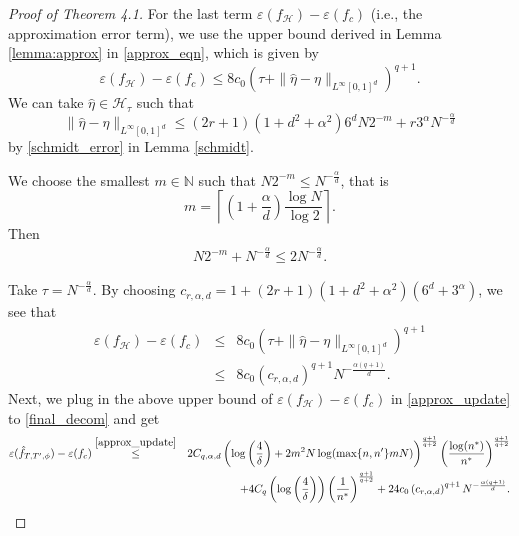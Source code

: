 \documentclass{article}
\def\NN{\mathbb N}
\begin{document}
\begin{proof}[Proof of Theorem 4.1]
  For the last term $\varepsilon(f_\mathcal{H}) - \varepsilon(f_c)$ (i.e., the approximation error term), we use the upper bound derived in Lemma \ref{lemma:approx} in \eqref{approx_eqn}, which is given by 
  \begin{equation*}
  \varepsilon(f_\mathcal{H}) - \varepsilon(f_c) \leq 8c_0\left(\tau +\|\widehat{\eta}-\eta\|_{L^\infty[0,1]^d}\right)^{q+1}.
  \end{equation*}
  We can take $\widehat{\eta} \in \mathcal{H}_\tau$ such that
  $$\|\widehat{\eta}-\eta\|_{L^\infty[0,1]^d}\leq (2r+1)(1+d^2 + \alpha^2)6^d N 2^{-m} + r3^\alpha N^{-\frac{\alpha}{d}}$$
by \eqref{schmidt_error} in Lemma \ref{schmidt}. 

We choose the smallest $m\in \NN$ such that 
$N 2^{-m} \leq N^{-\frac{\alpha}{d}}$, that is \begin{equation}\label{choice_of_m}
    m =\left \lceil \left(1+ \frac{\alpha}{d}\right) \frac{\log N}{\log 2}\right \rceil.
\end{equation} 
Then 
\begin{eqnarray}\label{large_N}
   N 2^{-m}  +  N^{-\frac{\alpha}{d}} \leq 2 N^{-\frac{\alpha}{d}}. 
\end{eqnarray}

Take $\tau = N^{-\frac{\alpha}{d}}$.  By choosing $c_{r,\alpha,d} = 1+ (2r+1)(1+d^2 + \alpha^2)(6^d+3^\alpha)$, we see that 
    \begin{eqnarray}\label{approx_update}
  \varepsilon(f_\mathcal{H}) - \varepsilon(f_c)&\leq&  
  8c_0\left(\tau +\|\widehat{\eta}-\eta\|_{L^\infty[0,1]^d}\right)^{q+1} \nonumber\\
 &\leq& 8c_0 \left(c_{r,\alpha,d}\right)^{q+1} N^{-\frac{\alpha(q+1)}{d}} .
  \end{eqnarray}
  Next, we plug in the above upper bound of $\varepsilon(f_\mathcal{H}) - \varepsilon(f_c)$ in \eqref{approx_update} to \eqref{final_decom} and get
  \begin{eqnarray*}
      \varepsilon(\Hat{f}_{T, T^\prime,\phi}) - \varepsilon(f_c)
      &\stackrel{\eqref{approx_update}}{\leq}& 2C_{q,\alpha, d} \left(\log \left(\frac{4}{\delta}\right) + 2m^2 N \log(\max\{n, n^\prime\}mN)\right)^{\frac{q+1}{q+2}} \left(\frac{\log(n^*)}{n^*}\right)^{\frac{q+1}{q+2}} \\
&&+ 4C_{q} \left(\log\left(\frac{4}{\delta}\right)\right)\left(\frac{1}{n^*}\right)^{\frac{q+1}{q+2}} + 24 c_0 \left(
 c_{r,\alpha,d}\right)^{q+1}  N^{-\frac{\alpha(q+1)}{d}}. 
  \end{eqnarray*}


\end{proof}
\end{document}
